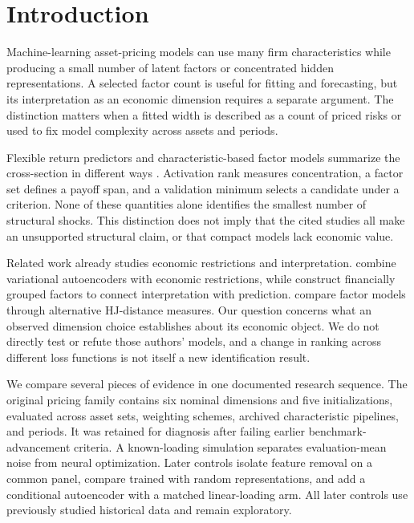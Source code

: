 \section{Introduction}

Machine-learning asset-pricing models can use many firm characteristics while producing a small number of latent factors or concentrated hidden representations. A selected factor count is useful for fitting and forecasting, but its interpretation as an economic dimension requires a separate argument. The distinction matters when a fitted width is described as a count of priced risks or used to fix model complexity across assets and periods.

Flexible return predictors and characteristic-based factor models summarize the cross-section in different ways \citep{gu2020empirical,kelly2019characteristics,gu2021autoencoder,chen2024deep}. Activation rank measures concentration, a factor set defines a payoff span, and a validation minimum selects a candidate under a criterion. None of these quantities alone identifies the smallest number of structural shocks. This distinction does not imply that the cited studies all make an unsupported structural claim, or that compact models lack economic value.

Related work already studies economic restrictions and interpretation. \citet{chen2026vaeer} combine variational autoencoders with economic restrictions, while \citet{zhao2026categorical} construct financially grouped factors to connect interpretation with prediction. \citet{zhang2021tradable} compare factor models through alternative HJ-distance measures. Our question concerns what an observed dimension choice establishes about its economic object. We do not directly test or refute those authors' models, and a change in ranking across different loss functions is not itself a new identification result.

We compare several pieces of evidence in one documented research sequence. The original pricing family contains six nominal dimensions and five initializations, evaluated across asset sets, weighting schemes, archived characteristic pipelines, and periods. It was retained for diagnosis after failing earlier benchmark-advancement criteria. A known-loading simulation separates evaluation-mean noise from neural optimization. Later controls isolate feature removal on a common panel, compare trained with random representations, and add a conditional autoencoder with a matched linear-loading arm. All later controls use previously studied historical data and remain exploratory.

